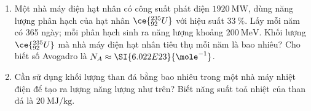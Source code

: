 \begin{ex}
	\begin{enumerate}[label=\alph*)]
		\item Một nhà máy điện hạt nhân có công suất phát điện $\SI{1920}{\mega\watt}$, dùng năng lượng phân hạch của hạt nhân $\ce{_{92}^{235}U}$ với hiệu suất $\SI{33}{\percent}$. Lấy mỗi năm có 365 ngày; mỗi phân hạch sinh ra năng lượng khoảng $\SI{200}{\mega\electronvolt}$. Khối lượng $\ce{_{92}^{235}U}$ mà nhà máy điện hạt nhân tiêu thụ mỗi năm là bao nhiêu? Cho biết số Avogadro là $N_{A} \approx \SI{6.022E23}{\mole^{-1}}$.
		\item Cần sử dụng khối lượng than đá bằng bao nhiêu trong một nhà máy nhiệt điện để tạo ra lượng năng lượng như trên? Biết năng suất toả nhiệt của than đá là $\SI{20}{\mega\joule/\kilogram}$.
	\end{enumerate}
\end{ex}
